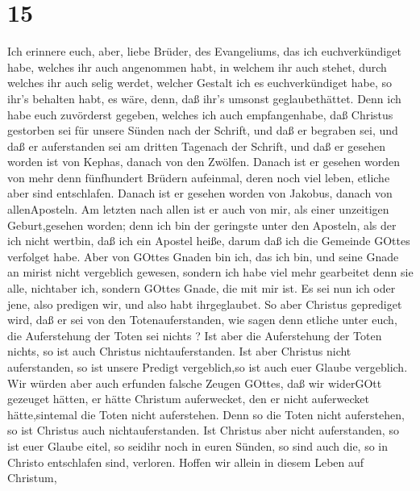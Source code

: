 \hypertarget{section-14}{%
\section{15}\label{section-14}}

 Ich erinnere euch, aber, liebe Brüder, des Evangeliums, das
ich euchverkündiget habe, welches ihr auch angenommen habt, in welchem
ihr auch stehet,  durch welches ihr auch selig werdet,
welcher Gestalt ich es euchverkündiget habe, so ihr's behalten habt, es
wäre, denn, daß ihr's umsonst geglaubethättet.  Denn ich
habe euch zuvörderst gegeben, welches ich auch empfangenhabe, daß
Christus gestorben sei für unsere Sünden nach der Schrift, 
und daß er begraben sei, und daß er auferstanden sei am dritten Tagenach
der Schrift,  und daß er gesehen worden ist von Kephas,
danach von den Zwölfen.  Danach ist er gesehen worden von
mehr denn fünfhundert Brüdern aufeinmal, deren noch viel leben, etliche
aber sind entschlafen.  Danach ist er gesehen worden von
Jakobus, danach von allenAposteln.  Am letzten nach allen
ist er auch von mir, als einer unzeitigen Geburt,gesehen worden;
 denn ich bin der geringste unter den Aposteln, als der ich
nicht wertbin, daß ich ein Apostel heiße, darum daß ich die Gemeinde
GOttes verfolget habe.  Aber von GOttes Gnaden bin ich, das
ich bin, und seine Gnade an mirist nicht vergeblich gewesen, sondern ich
habe viel mehr gearbeitet denn sie alle, nichtaber ich, sondern GOttes
Gnade, die mit mir ist.  Es sei nun ich oder jene, also
predigen wir, und also habt ihrgeglaubet.  So aber Christus
geprediget wird, daß er sei von den Totenauferstanden, wie sagen denn
etliche unter euch, die Auferstehung der Toten sei nichts ?
 Ist aber die Auferstehung der Toten nichts, so ist auch
Christus nichtauferstanden.  Ist aber Christus nicht
auferstanden, so ist unsere Predigt vergeblich,so ist auch euer Glaube
vergeblich.  Wir würden aber auch erfunden falsche Zeugen
GOttes, daß wir widerGOtt gezeuget hätten, er hätte Christum
auferwecket, den er nicht auferwecket hätte,sintemal die Toten nicht
auferstehen.  Denn so die Toten nicht auferstehen, so ist
Christus auch nichtauferstanden.  Ist Christus aber nicht
auferstanden, so ist euer Glaube eitel, so seidihr noch in euren Sünden,
 so sind auch die, so in Christo entschlafen sind,
verloren.  Hoffen wir allein in diesem Leben auf Christum,
